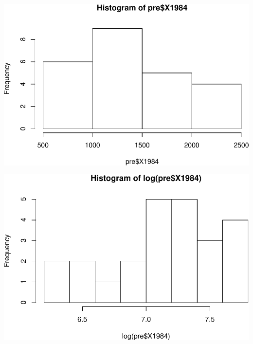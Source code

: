 \documentclass[11pt,]{article}
\newenvironment{Shaded}{\begin{snugshade}}{\end{snugshade}}
\newcommand{\KeywordTok}[1]{\textcolor[rgb]{0.13,0.29,0.53}{\textbf{#1}}}
\newcommand{\OperatorTok}[1]{\textcolor[rgb]{0.81,0.36,0.00}{\textbf{#1}}}
\newcommand{\NormalTok}[1]{#1}
\begin{document}
\begin{Shaded}
\end{Shaded}

\includegraphics{proyecto_files/figure-latex/unnamed-chunk-34-1.pdf}

\begin{Shaded}
\end{Shaded}

\includegraphics{proyecto_files/figure-latex/unnamed-chunk-34-2.pdf}
\end{document}

